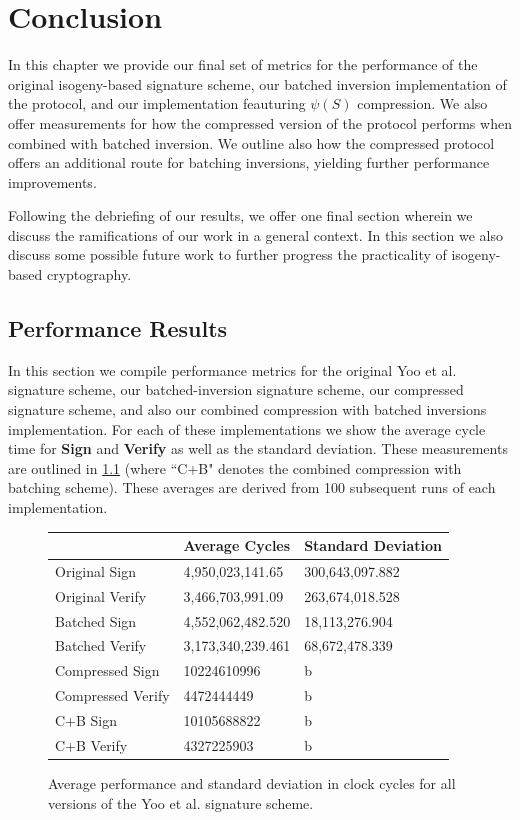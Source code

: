 \chapter{Conclusion}
\label{ch:conclusion}

In this chapter we provide our final set of metrics for the performance of the original isogeny-based signature scheme, our batched inversion implementation of the protocol, and our implementation feauturing $\psi(S)$ compression. We also offer measurements for how the compressed version of the protocol performs when combined with batched inversion. We outline also how the compressed protocol offers an additional route for batching inversions, yielding further performance improvements.

Following the debriefing of our results, we offer one final section wherein we discuss the ramifications of our work in a general context. In this section we also discuss some possible future work to further progress the practicality of isogeny-based cryptography.



\section{Performance Results}

In this section we compile performance metrics for the original Yoo et al. signature scheme, our batched-inversion signature scheme, our compressed signature scheme, and also our combined compression with batched inversions implementation. For each of these implementations we show the average cycle time for \textbf{Sign} and \textbf{Verify} as well as the standard deviation. These measurements are outlined in \ref{fig:allmeasurements} (where ``C+B" denotes the combined compression with batching scheme). These averages are derived from 100 subsequent runs of each implementation.

\begin{figure}
\begin{center}
\begin{tabular}{ | l | b | b | }
\hline
& Average Cycles & Standard Deviation \\
\hline
Original Sign & 4,950,023,141.65 & 300,643,097.882 \\
Original Verify & 3,466,703,991.09 & 263,674,018.528 \\
Batched Sign & 4,552,062,482.520 & 18,113,276.904 \\
Batched Verify & 3,173,340,239.461 & 68,672,478.339 \\
Compressed Sign & 10224610996 & b \\
Compressed Verify & 4472444449 & b \\
C+B Sign & 10105688822 & b \\
C+B Verify & 4327225903 & b \\
\hline
\end{tabular}
\end{center}
\caption{Average performance and standard deviation in clock cycles for all versions of the Yoo et al. signature scheme.}
\label{fig:allmeasurements}
\end{figure}

